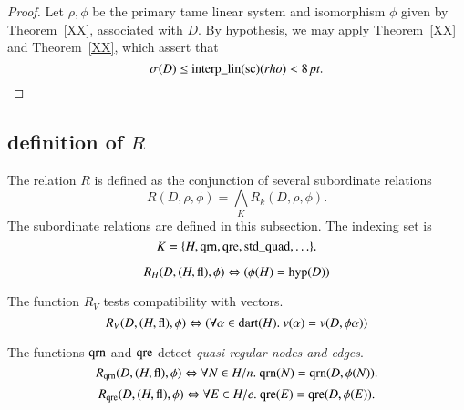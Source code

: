 \begin{proof}  Let $\rho,\phi$ be the
primary tame linear system and isomorphism $\phi$ given by Theorem~\ref{XX}, associated with $D$. By hypothesis, we may apply Theorem~\ref{XX}
and Theorem~\ref{XX}, which assert that
    $$\sigma(D) \le {\operatorname{interp\_lin}}({\operatorname{sc}})(rho) < 8\,\hbox{\it pt}.$$
\end{proof}

\subsection{definition of $R$}

The relation $R$ is defined as the conjunction of several
subordinate relations
    $$R(D,\rho,\phi) = \bigwedge_K R_k (D,\rho,\phi).$$
The subordinate relations are defined in this subsection. The
indexing set is
    $$
    K = \{H,{\operatorname{qrn}},{\operatorname{qre}},{\operatorname{std\_quad}},\ldots\}.
    $$


\begin{definition}[$R_H$]
    $$R_H(D,(H,{{\operatorname{fl}}}),\phi) \Leftrightarrow (\phi(H)={\operatorname{hyp}}(D))$$
\end{definition}

\begin{definition}[$R_V$]
The function $R_{V}$ tests compatibility with vectors.
    $$R_V(D,(H,{{\operatorname{fl}}}),\phi) \Leftrightarrow
        (\forall \alpha\in {\operatorname{dart}}(H).\ v(\alpha) =
        v(D,\phi\alpha))$$
\end{definition}

\begin{definition}
 The functions ${\operatorname{qrn}}$ and ${\operatorname{qre}}$ detect {\it quasi-regular
 nodes and edges}.
        $$R_{{\operatorname{qrn}}}(D,(H,{\operatorname{fl}}),\phi) \Leftrightarrow
        \forall N\in H/n.\ {\operatorname{qrn}}(N) = {\operatorname{qrn}}(D,\phi(N)).
        $$
        $$R_{{\operatorname{qre}}}(D,(H,{\operatorname{fl}}),\phi) \Leftrightarrow
        \forall E\in H/e.\ {\operatorname{qre}}(E) = {\operatorname{qre}}(D,\phi(E)).
        $$
\end{definition}



